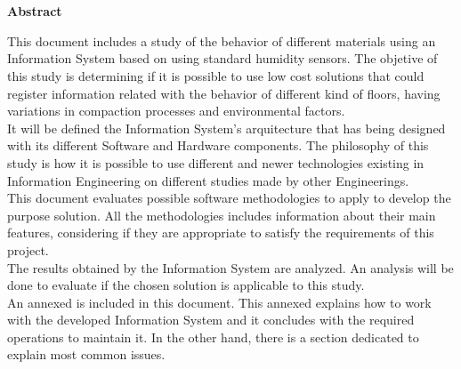 

\newpage


\chapter*{}
\begin{center}
\textbf{Abstract}
\end{center}

This document includes a study of the behavior of different materials using an Information System based on using standard humidity sensors. The objetive of this study is determining if it is possible to use low cost solutions that could register information related with the behavior of different kind of floors, having variations in compaction processes and environmental factors.\\

It will be defined the Information System's arquitecture that has being designed with its different Software and Hardware components. The philosophy of this study is how it is possible to use different and newer technologies existing in Information Engineering on different studies made by other Engineerings.\\

This document evaluates possible software methodologies to apply to develop the purpose solution. All the methodologies includes information about their main features, considering if they are appropriate to satisfy the requirements of this project.\\

The results obtained by the Information System are analyzed. An analysis will be done to evaluate if the chosen solution is applicable to this study.\\

An annexed is included in this document. This annexed explains how to work with the developed Information System and it concludes with the required operations to maintain it. In the other hand, there is a section dedicated to explain most common issues.


